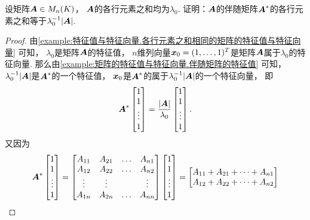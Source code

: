 \begin{example}\label{example:特征值与特征向量.各行元素之和相同的矩阵的伴随矩阵的特征值与特征向量}
设矩阵\(\boldsymbol{A} \in M_n(K)\)，
\(\boldsymbol{A}\)的各行元素之和均为\(\lambda_0\).
证明：\(\boldsymbol{A}\)的伴随矩阵\(\boldsymbol{A}^*\)的各行元素之和等于\(\lambda_0^{-1} \abs{\boldsymbol{A}}\).
\begin{proof}
由\cref{example:特征值与特征向量.各行元素之和相同的矩阵的特征值与特征向量} 可知，
\(\lambda_0\)是矩阵\(\boldsymbol{A}\)的特征值，
\(n\)维列向量\(\boldsymbol{x}_0=(1,\dotsc,1)^T\)是矩阵\(\boldsymbol{A}\)属于\(\lambda_0\)的特征向量.
那么由\cref{example:矩阵的特征值与特征向量.伴随矩阵的特征值} 可知，
\(\lambda_0^{-1} \abs{\boldsymbol{A}}\)是\(\boldsymbol{A}^*\)的一个特征值，
\(\boldsymbol{x}_0\)是\(\boldsymbol{A}^*\)的属于\(\lambda_0^{-1} \abs{\boldsymbol{A}}\)的一个特征向量，
即\begin{equation*}
	\boldsymbol{A}^*
	\begin{bmatrix}
		1 \\ 1 \\ \vdots \\ 1
	\end{bmatrix}
	= \frac{\abs{\boldsymbol{A}}}{\lambda_0}
	\begin{bmatrix}
		1 \\ 1 \\ \vdots \\ 1
	\end{bmatrix}.
\end{equation*}
又因为\begin{equation*}
	\boldsymbol{A}^*
	\begin{bmatrix}
		1 \\ 1 \\ \vdots \\ 1
	\end{bmatrix}
	= \begin{bmatrix}
		A_{11} & A_{21} & \dots & A_{n1} \\
		A_{12} & A_{22} & \dots & A_{n2} \\
		\vdots & \vdots & & \vdots \\
		A_{1n} & A_{2n} & \dots & A_{nn}
	\end{bmatrix}
	\begin{bmatrix}
		1 \\ 1 \\ \vdots \\ 1
	\end{bmatrix}
	= \begin{bmatrix}
		A_{11} + A_{21} + \dotsb + A_{n1} \\
		A_{12} + A_{22} + \dotsb + A_{n2} \\

\end{bmatrix}
\end{equation*}
\end{proof}
\end{example}
